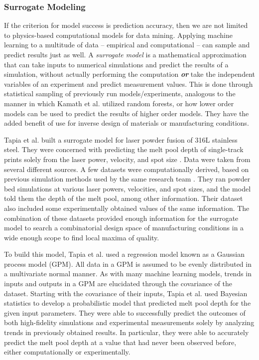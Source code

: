 \subsubsection{Surrogate Modeling}

If the criterion for model success is prediction accuracy, then we are not limited to physics-based computational models for data mining. Applying machine learning to a multitude of data -- empirical and computational -- can sample and predict results just as well. A \textit{surrogate model} is a mathematical approximation that can take inputs to numerical simulations and predict the results of a simulation, without actually performing the computation \textbf{\textit{or}} take the independent variables of an experiment and predict measurement values. This is done through statistical sampling of previously run models/experiments, analogous to the manner in which Kamath et al. utilized random forests, or how lower order models can be used to predict the results of higher order models. They have the added benefit of use for inverse design of materials or manufacturing conditions. 

Tapia et al. built a surrogate model for laser powder fusion of 316L stainless steel. They were concerned with predicting the melt pool depth of single-track prints solely from the laser power, velocity, and spot size \cite{Tapia2017}. Data were taken from several different sources. A few datasets were computationally derived, based on previous simulation methods used by the same research team \cite{King2014, Khairallah2016}. They ran powder bed simulations at various laser powers, velocities, and spot sizes, and the model told them the depth of the melt pool, among other information. Their dataset also included some experimentally obtained values of the same information. The combination of these datasets provided enough information for the surrogate model to search a combinatorial design space of manufacturing conditions in a wide enough scope to find local maxima of quality.

To build this model, Tapia et al. used a regression model known as a Gaussian process model (GPM). All data in a GPM is assumed to be evenly distributed in a multivariate normal manner. As with many machine learning models, trends in inputs and outputs in a GPM are elucidated through the covariance of the dataset. Starting with the covariance of their inputs, Tapia et al. used Bayesian statistics to develop a probabilistic model that predicted melt pool depth for the given input parameters. They were able to successfully predict the outcomes of both high-fidelity simulations and experimental measurements solely by analyzing trends in previously obtained results. In particular, they were able to accurately predict the melt pool depth at a value that had never been observed before, either computationally or experimentally. 